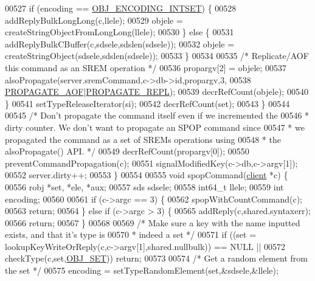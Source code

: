 \begin{DoxyCode}
00527             \textcolor{keywordflow}{if} (encoding == \hyperlink{server_8h_a214173987de21c3b7661fddd42b05873}{OBJ\_ENCODING\_INTSET}) \{
00528                 addReplyBulkLongLong(c,llele);
00529                 objele = createStringObjectFromLongLong(llele);
00530             \} \textcolor{keywordflow}{else} \{
00531                 addReplyBulkCBuffer(c,sdsele,sdslen(sdsele));
00532                 objele = createStringObject(sdsele,sdslen(sdsele));
00533             \}
00534 
00535             \textcolor{comment}{/* Replicate/AOF this command as an SREM operation */}
00536             propargv[2] = objele;
00537             alsoPropagate(server.sremCommand,c->db->id,propargv,3,
00538                 \hyperlink{server_8h_a542fb79924ca427c866fd63632f60777}{PROPAGATE\_AOF}|\hyperlink{server_8h_a59c6e025b4ed85642a0472fc3e73e298}{PROPAGATE\_REPL});
00539             decrRefCount(objele);
00540         \}
00541         setTypeReleaseIterator(si);
00542         decrRefCount(set);
00543     \}
00544 
00545     \textcolor{comment}{/* Don't propagate the command itself even if we incremented the}
00546 \textcolor{comment}{     * dirty counter. We don't want to propagate an SPOP command since}
00547 \textcolor{comment}{     * we propagated the command as a set of SREMs operations using}
00548 \textcolor{comment}{     * the alsoPropagate() API. */}
00549     decrRefCount(propargv[0]);
00550     preventCommandPropagation(c);
00551     signalModifiedKey(c->db,c->argv[1]);
00552     server.dirty++;
00553 \}
00554 
00555 \textcolor{keywordtype}{void} spopCommand(\hyperlink{structclient}{client} *c) \{
00556     robj *set, *ele, *aux;
00557     sds sdsele;
00558     int64\_t llele;
00559     \textcolor{keywordtype}{int} encoding;
00560 
00561     \textcolor{keywordflow}{if} (c->argc == 3) \{
00562         spopWithCountCommand(c);
00563         \textcolor{keywordflow}{return};
00564     \} \textcolor{keywordflow}{else} \textcolor{keywordflow}{if} (c->argc > 3) \{
00565         addReply(c,shared.syntaxerr);
00566         \textcolor{keywordflow}{return};
00567     \}
00568 
00569     \textcolor{comment}{/* Make sure a key with the name inputted exists, and that it's type is}
00570 \textcolor{comment}{     * indeed a set */}
00571     \textcolor{keywordflow}{if} ((set = lookupKeyWriteOrReply(c,c->argv[1],shared.nullbulk)) == NULL ||
00572         checkType(c,set,\hyperlink{server_8h_a8d179375a4aac33d3fa7aa80c8ccc75f}{OBJ\_SET})) \textcolor{keywordflow}{return};
00573 
00574     \textcolor{comment}{/* Get a random element from the set */}
00575     encoding = setTypeRandomElement(set,&sdsele,&llele);

\end{DoxyCode}
